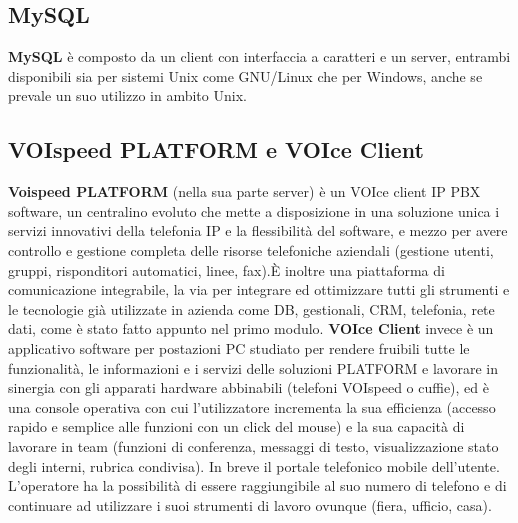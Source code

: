 \subsection{MySQL}
\textbf{MySQL} \`e  composto da un client
con interfaccia a caratteri e un server, entrambi disponibili sia per sistemi
Unix come GNU/Linux che per Windows, anche se prevale un suo utilizzo in ambito
Unix.

\subsection{VOIspeed PLATFORM e VOIce Client}
\textbf{Voispeed PLATFORM} (nella sua parte server) \`e un  VOIce client IP PBX software, un centralino
evoluto che mette a disposizione in una soluzione unica i servizi innovativi
della telefonia IP e la flessibilit\`a del software, e mezzo per avere controllo
e gestione completa delle risorse telefoniche aziendali (gestione utenti,
gruppi, risponditori automatici, linee, fax).\`E inoltre una piattaforma di
comunicazione integrabile, la via per integrare ed ottimizzare tutti gli
strumenti e le tecnologie gi\`a utilizzate in azienda come DB, gestionali, CRM,
telefonia, rete dati, come \`e stato fatto appunto nel primo modulo.
\textbf{VOIce Client} invece \`e un applicativo software per postazioni PC studiato per rendere fruibili tutte le funzionalit\`a, le
informazioni e i servizi delle soluzioni PLATFORM e lavorare in sinergia con gli apparati hardware abbinabili 
(telefoni VOIspeed o cuffie), ed \`e una console operativa con cui l'utilizzatore incrementa la sua efficienza 
(accesso rapido e semplice alle funzioni con un click del mouse) e la sua capacit\`a di lavorare
in team (funzioni di conferenza, messaggi di testo, visualizzazione stato degli
interni, rubrica condivisa). In breve il portale telefonico mobile dell'utente.
L'operatore ha la possibilit\`a di essere raggiungibile al suo numero di
telefono e di continuare ad utilizzare i suoi strumenti di lavoro ovunque (fiera, ufficio, casa). 

